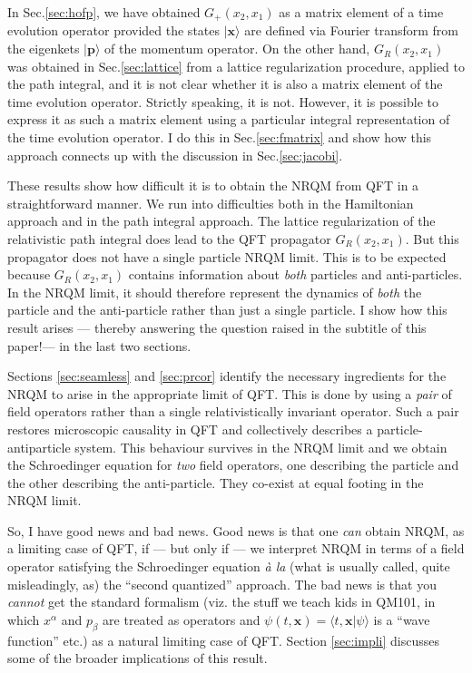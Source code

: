 \documentclass[12pt]{article}
\def\ket#1{|#1\rangle}                    %
\def\amp#1#2{\langle #1 | #2\rangle}      %
\begin{document}
 In Sec.\ref{sec:hofp},  we  have obtained $G_+(x_2,x_1)$ as a matrix element of a time evolution operator provided the states $\ket{\bm{x}}$ are defined via Fourier transform from the eigenkets $\ket{\bm{p}}$ of the momentum operator. On the other hand, $G_R(x_2,x_1)$ was obtained in Sec.\ref{sec:lattice}  from a lattice regularization procedure, applied to the path integral,  and it is not clear whether it is also a matrix element of the time evolution operator. Strictly speaking, it is not. However, it is possible to express it as such a matrix element using a particular integral representation of the time evolution operator. I do this in Sec.\ref{sec:fmatrix} and show how this approach connects up with the  discussion in Sec.\ref{sec:jacobi}. 
 
 These results show how difficult it is to obtain the NRQM from QFT in a  straightforward manner. We run into difficulties  both in the Hamiltonian approach and in the path integral approach. The lattice regularization of the relativistic path integral does lead to the QFT propagator $G_R(x_2,x_1)$. But this propagator does not have a single particle NRQM limit. This is to be expected because $G_R(x_2,x_1)$ contains information about \textit{both} particles and anti-particles. In the NRQM limit, it should therefore represent the dynamics of \textit{both} the particle and the anti-particle rather than just a single particle. I show how this result arises --- thereby answering the question raised in the subtitle of this paper!--- in the last two sections. 
 
 Sections \ref{sec:seamless} and \ref{sec:prcor} identify the necessary ingredients for the NRQM to arise in the appropriate limit of QFT. This is done by using a \textit{pair} of field operators rather than a single relativistically invariant operator. Such a pair restores microscopic causality in QFT and collectively describes a particle-antiparticle system. This behaviour survives in the NRQM limit and we obtain the Schroedinger equation for \textit{two} field operators, one describing the particle and the other describing the anti-particle. They co-exist at equal footing in the NRQM limit. 
 

So, I have good news and bad news. Good news is that one \textit{can} obtain NRQM, as a limiting case of QFT, if --- but only if --- we interpret NRQM in terms of a field operator satisfying the Schroedinger equation \textit{\`{a} la} (what is usually called, quite misleadingly, as) the ``second quantized'' approach. The bad news is that you \textit{cannot} get the standard formalism (viz. the stuff we teach kids in QM101, in which $x^\alpha$ and $p_\beta$ are treated as operators and $\psi(t,\bm{x})=\amp{t,\bm{x}}{\psi}$ is a ``wave function'' etc.) as a natural limiting case of QFT. Section \ref{sec:impli} discusses some of the broader implications of this result.
\end{document}
